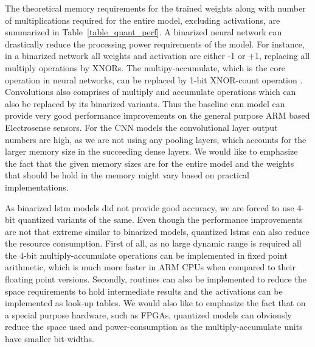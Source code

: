 The theoretical memory requirements for the trained weights along with number of multiplications required for the entire model, excluding activations, are summarized in Table~\ref{table_quant_perf}. A binarized neural network can drastically reduce the processing power requirements of the model. For instance, in a binarized network all weights and activation are either -1 or +1, replacing all multiply operations by XNORs. The multipy-accumulate, which is the core operation in neural networks, can be replaced by 1-bit XNOR-count operation \cite{quant_neural}. Convolutions also comprises of multiply and accumulate operations which can also be replaced by its binarized variants. Thus the baseline \ac{cnn} model can provide very good performance improvements on the general purpose ARM based Electrosense sensors. For the CNN models the convolutional layer output numbers are high, as we are not using any pooling layers, which accounts for the larger memory size in the succeeding dense layers. We would like to emphasize the fact that the given memory sizes are for the entire model and the weights that should be hold in the memory might vary based on practical implementations. 

As binarized \ac{lstm} models did not provide good accuracy, we are forced to use 4-bit quantized variants of the same. Even though the performance improvements are not that extreme similar to binarized models, quantized \ac{lstm}s can also reduce the resource consumption. First of all, as no large dynamic range is required all the 4-bit multiply-accumulate operations can be implemented in fixed point arithmetic, which is much more faster in ARM CPUs when compared to their floating point versions. Secondly, routines can also be implemented to reduce the space requirements to hold intermediate results and the activations can be implemented as look-up tables. We would also like to emphasize the fact that on a special purpose hardware, such as FPGAs, quantized models can obviously reduce the space used  and power-consumption as the multiply-accumulate units have smaller bit-widths.

